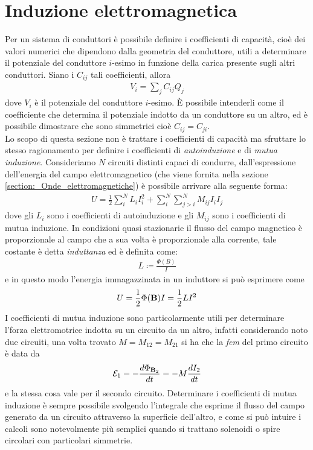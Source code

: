 \section{Induzione elettromagnetica}
Per un sistema di conduttori è possibile definire i coefficienti di capacità, cioè dei valori numerici che dipendono dalla geometria del 
conduttore, utili a determinare il potenziale del conduttore $ i $-esimo in funzione della carica presente sugli altri conduttori. Siano i $ C_{ij} $ tali 
coefficienti, allora
\begin{align}
  V_i = \sum_{j} C_{ij} Q_j
\end{align}
dove $ V_i $ è il potenziale del conduttore $ i $-esimo. È possibile intenderli come il coefficiente che determina il potenziale indotto da un conduttore 
su un altro, ed è possibile dimostrare che sono simmetrici cioè $ C_{ij} = C_{ji} $.\\
Lo scopo di questa sezione non è trattare i coefficienti di capacità ma sfruttare lo stesso ragionamento per definire i coefficienti di \textit{autoinduzione} 
e di \textit{mutua induzione}. Consideriamo $ N $ circuiti distinti capaci di condurre, dall'espressione dell'energia del campo elettromagnetico 
(che viene fornita nella sezione \ref{section:_Onde_elettromagnetiche}) è possibile arrivare alla seguente forma:
\begin{align}
  U = \frac{1}{2} \sum_{i}^N L_i I_i^2 + \sum_i^N \sum_{j>i}^N M_{ij}I_i I_j
\end{align}
dove gli $ L_i $ sono i coefficienti di autoinduzione e gli $ M_{ij} $ sono i coefficienti di mutua induzione. In condizioni quasi stazionarie il flusso 
del campo magnetico è proporzionale al campo che a sua volta è proporzionale alla corrente, tale costante è detta \textit{induttanza} ed è definita come:
\begin{align}
  L \coloneq \frac{\Phi(B)}{I}
\end{align}
e in questo modo l'energia immagazzinata in un induttore si può esprimere come
\begin{align}
  U = \frac{1}{2} \Phi(\mathbf{ B }) I = \frac{1}{2} L I^2
\end{align}
I coefficienti di mutua induzione sono particolarmente utili per determinare l'forza elettromotrice indotta su un circuito da un altro, infatti considerando 
noto due circuiti, una volta trovato $ M = M_{12} = M_{21} $ si ha che la \textit{fem} del primo circuito è data da
\begin{align}
  \mathcal{E}_1 = - \frac{d\Phi_{\mathbf{ B }_2}}{dt} = - M \frac{dI_2}{dt}
\end{align}
e la stessa cosa vale per il secondo circuito. Determinare i coefficienti di mutua induzione è sempre possibile svolgendo l'integrale che esprime il flusso 
del campo generato da un circuito attraverso la superficie dell'altro, e come si può intuire i calcoli sono notevolmente più semplici quando si trattano 
solenoidi o spire circolari con particolari simmetrie.

